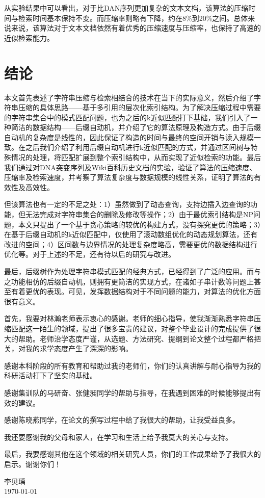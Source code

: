 ﻿\documentclass{sysuthesis}
\begin{document}
从实验结果中可以看出，对于比DAN序列更加复杂的文本文档，该算法的压缩时间与检索时间基本保持不变。而压缩率则略有下降，约在8\%到20\%之间。总体来说来说，该算法对于文本文档依然有着优秀的压缩速度与压缩率，也保持了高速的近似检索能力。



\chapter{结论}
本文首先表述了字符串压缩与检索相结合的技术在当下的实际意义，然后介绍了字符串压缩的具体思路——基于多引用的层次化索引结构。为了解决压缩过程中需要的字符串集合中的模式匹配问题，也为之后的k近似匹配打下基础，我们引入了一种简洁的数据结构——后缀自动机，并介绍了它的算法原理及构造方式。由于后缀自动机的复杂度是线性的，因此保证了构造的时间与最终的空间开销与读入规模一致。在之后我们介绍了利用后缀自动机进行k近似匹配的方式，并通过区间树与特殊情况的处理，将匹配扩展到整个索引结构中，从而实现了近似检索的功能。最后我们通过对DNA突变序列及Wiki百科历史文档的实验，验证了算法的压缩速度、压缩率及检索速度，并考察了算法复杂度与数据规模的线性关系，证明了算法的有效性及高效性。\par
但该算法也有一定的不足之处：1）虽然做到了动态查询，支持边插入边查询的功能，但无法完成对字符串集合的删除及修改等操作；2）由于最优索引结构是NP问题，本文只提出了一个基于贪心策略的较优的构建方式，没有探究更优的策略；3）在基于后缀自动机的k近似匹配中，仅使用了滚动数组优化的动态规划算法，还有改进的空间；4）区间数与边界情况的处理复杂度略高，需要更优的数据结构进行优化等。对于上述的不足，还有待以后的研究与改进。\par
最后，后缀树作为处理字符串模式匹配的经典方式，已经得到了广泛的应用。而与之功能相仿的后缀自动机，则拥有更简洁的实现方式，在诸如子串计数等问题上甚至有着更优的表现。可见，发挥数据结构对于不同问题的能力，对算法的优化方面很有意义。



\songti



\appendix

\begin{thankto}
	\songti{}
	首先，我要对林瀚老师表示衷心的感谢。老师的细心指导，使我渐渐熟悉字符串压缩匹配这一陌生的领域，提出了很多宝贵的建议，对整个毕业设计的完成提供了很大的帮助。老师治学态度严谨，从选题、方法研究、提纲到论文整个过程都严格把关，对我的求学态度产生了深深的影响。\par
	感谢本科阶段的所有教育和帮助过我的老师们，你们的认真讲解与耐心指导为我的科研活动打下了坚实的基础。\par
	感谢集训队的马研奋、张健昶同学的帮助与指导，在我遇到困难的时候能够提出有效的建议。\par
	感谢陈晓燕同学，在论文的撰写过程中给了我很大的帮助，让我受益良多。\par
	我还要感谢我的父母和家人，在学习和生活上给予我莫大的关心与支持。\par
	最后，我要感谢其他在这个领域的相关研究人员，你们的工作成果给予了我很大的启示。谢谢你们！

	\vskip 18pt
	\begin{flushright}
		李贝瑀\\
		\today
	\end{flushright}
\end{thankto}

\backmatter
\end{document}
